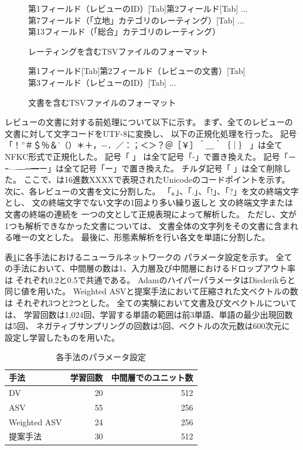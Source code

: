 \begin{figure}
  第1フィールド（レビューのID）{[Tab]}第2フィールド{[Tab]} ... \\
  第7フィールド（「立地」カテゴリのレーティング）{[Tab]} ... \\
  第13フィールド（「総合」カテゴリのレーティング）
  \caption{レーティングを含むTSVファイルのフォーマット}
  \label{fig:RatingFileFormat}
\end{figure}

\begin{figure}
  第1フィールド{[Tab]}第2フィールド（レビューの文書）{[Tab]} \\
  第3フィールド（レビューのID）{[Tab]} ...
  \caption{文書を含むTSVファイルのフォーマット}
  \label{fig:DocumentFileFormat}
\end{figure}

レビューの文書に対する前処理について以下に示す。
まず、全てのレビューの文書に対して文字コードをUTF-8に変換し、
以下の正規化処理を行った。
記号「！”＃＄％＆’（）＊＋，−．／：；＜＞？＠［￥］＾＿｀｛｜｝
」は全てNFKC形式で正規化した。
記号「
」
は全て記号「-」で置き換えた。
記号「－ｰ—―─━ー」は全て記号「ー」で置き換えた。
チルダ記号「
」は全て削除した。
ここで、は16進数XXXXで表現されたUnicodeのコードポイントを示す。
次に、各レビューの文書を文に分割した。
「。」、「.」、「!」、「?」を文の終端文字とし、
文の終端文字でない文字の1回より多い繰り返しと
文の終端文字または文書の終端の連続を
一つの文として正規表現によって解析した。
ただし、文が1つも解析できなかった文書については、
文書全体の文字列をその文書に含まれる唯一の文とした。
最後に、形態素解析を行い各文を単語に分割した。

表\ref{tab:ParametersOfMethods}に各手法におけるニューラルネットワークの
パラメータ設定を示す。
全ての手法において、中間層の数は1、入力層及び中間層におけるドロップアウト率は
それぞれ0.2と0.5で共通である。
Adam\cite{diederik15}のハイパーパラメータはDiederikら\cite{diederik15}と
同じ値を用いた。
Weighted ASVと提案手法において圧縮された文ベクトルの数は
それぞれ3つと2つとした。
全ての実験において文書及び文ベクトルについては、
学習回数は1,024回、学習する単語の範囲は前3単語、単語の最少出現回数は5回、
ネガティブサンプリングの回数は5回、ベクトルの次元数は600次元に
設定し学習したものを用いた。

\begin{table}
  \caption{各手法のパラメータ設定}
  \centering
  \begin{tabular}{l | r r} \label{tab:ParametersOfMethods}
    手法 & 学習回数 & 中間層でのユニット数 \\
    \hline
    DV & 20 & 512 \\
    ASV & 55 & 256 \\
    Weighted ASV & 24 & 256 \\
    提案手法 & 30 & 512 \\
  \end{tabular}
\end{table}

